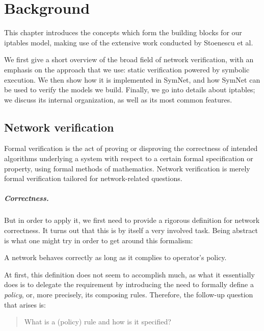 \chapter{Background}

This chapter introduces the concepts which form the building blocks for our
iptables model, making use of the extensive work conducted by Stoenescu et al.
\cite{stoenescu2013symnet, stoenescu2016symnet}

We first give a short overview of the broad field of network verification, with
an emphasis on the approach that we use: static verification powered by
symbolic execution.  We then show how it is implemented in SymNet, and how
SymNet can be used to verify the models we build.  Finally, we go into details
about iptables; we discuss its internal organization, as well as its most
common features.


\section{Network verification}\label{sec:network-verification}
Formal verification is the act of proving or disproving the correctness of
intended algorithms underlying a system with respect to a certain formal
specification or property, using formal methods of mathematics. Network
verification is merely formal verification tailored for network-related
questions.

\paragraph{Correctness.}\label{par:correctness}
But in order to apply it, we first need to provide a rigorous definition for
network correctness.  It turns out that this is by itself a very involved task.
Being abstract is what one might try in order to get around this formalism:

\begin{definition}
\label{def:full-correctness}
A network behaves correctly as long as it complies to operator's policy.
\end{definition}

At first, this definition does not seem to accomplish much, as what it
essentially does is to delegate the requirement by introducing the need to
formally define a \emph{policy}, or, more precisely, its composing rules.
Therefore, the follow-up question that arises is:

\begin{quote}
What is a (policy) rule and how is it specified?
\end{quote}


